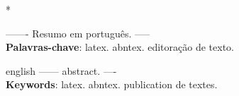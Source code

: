 \documentclass[12pt, a4paper, twoside, chapter=TITLE, subsection=TITLE, section=TITLE, subsubsection=TITLE, subsubsubsection=TITLE, english, german, brazil]{abntex2}
\begin{document}
\pretextual 
\imprimircapa
\imprimirfolhaderosto[]* %
\makeatother\cleardoublepage


\begin{resumo}[Resumo] 
    ------- Resumo em português. -----  \\
    \vspace{\onelineskip}
    \noindent
    \textbf{Palavras-chave}: latex. abntex. editoração de texto.
\end{resumo}

\begin{resumo}[Abstract]
    \begin{otherlanguage*}{english}
        ------ abstract. ---- \\
        \vspace{\onelineskip}
        \noindent
        \textbf{Keywords}: latex. abntex. publication de textes.
    \end{otherlanguage*}
\end{resumo}










\tableofcontents*
\cleardoublepage


\textual %

\postextual %
\end{document}
